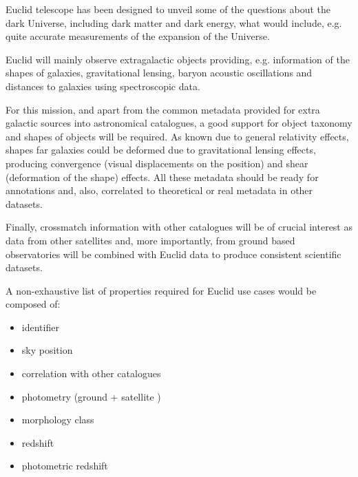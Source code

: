 Euclid telescope has been designed to unveil some of the questions about the
dark Universe, including dark matter and dark energy, what would include, e.g.
quite accurate measurements of the expansion of the Universe.

Euclid will mainly observe extragalactic objects providing, e.g. information
of the shapes of galaxies, gravitational lensing,  baryon acoustic oscillations
and distances to galaxies using spectroscopic data.

For this mission, and apart from the common metadata provided for extra galactic
sources into astronomical catalogues, a good support for object taxonomy and
shapes of objects will be required. As known due to general relativity effects,
shapes far galaxies could be deformed due to gravitational lensing effects,
producing convergence (visual displacements on the position) and shear (deformation
of the shape) effects. All these metadata should be ready for annotations and,
also, correlated to theoretical or real metadata in other datasets.

Finally, crossmatch information with other catalogues will be of crucial interest
as data from other satellites and, more importantly, from ground based
observatories will be combined with Euclid data to produce consistent scientific
datasets.

A non-exhaustive list of properties required for Euclid use cases would be composed
of:
\begin{itemize}
    \item identifier
    \item sky position
    \item correlation with other catalogues
    \item photometry (ground + satellite )
    \item morphology class
    \item redshift
    \item photometric redshift
\end{itemize}
